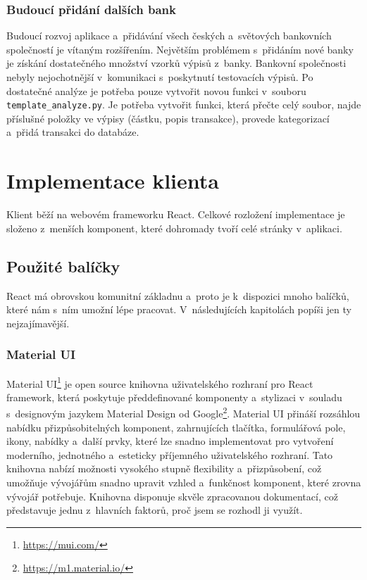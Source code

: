 \subsubsection{Budoucí přidání dalších bank}
\label{chap:addbank}
Budoucí rozvoj aplikace a~přidávání všech českých a~světových bankovních společností je vítaným rozšířením. Největším problémem s~přidáním nové banky je získání dostatečného množství vzorků výpisů z~banky. Bankovní společnosti nebyly nejochotnější v~komunikaci s~poskytnutí testovacích výpisů. Po dostatečné analýze je potřeba pouze vytvořit novou funkci v~souboru \texttt{template\_analyze.py}. Je potřeba vytvořit funkci, která přečte celý soubor, najde příslušné položky ve výpisy (částku, popis transakce), provede kategorizací a~přidá transakci do databáze.


\section{Implementace klienta} 

Klient běží na webovém frameworku React. Celkové rozložení implementace je složeno z~menších komponent, které dohromady tvoří celé stránky v~aplikaci.
\subsection{Použité balíčky}
React má obrovskou komunitní základnu a~proto je k~dispozici mnoho balíčků, které nám s~ním umožní lépe pracovat. V~následujících kapitolách popíši jen ty nejzajímavější.
\subsubsection{Material UI}
Material UI\footnote{\url{https://mui.com/}} je open source knihovna uživatelského rozhraní pro React framework, která poskytuje předdefinované komponenty a~stylizaci v~souladu s~designovým jazykem Material Design od Google\footnote{\url{https://m1.material.io/}}. Material UI přináší rozsáhlou nabídku přizpůsobitelných komponent, zahrnujících tlačítka, formulářová pole, ikony, nabídky a~další prvky, které lze snadno implementovat pro vytvoření moderního, jednotného a~esteticky příjemného uživatelského rozhraní. Tato knihovna nabízí možnosti vysokého stupně flexibility a~přizpůsobení, což umožňuje vývojářům snadno upravit vzhled a~funkčnost komponent, které zrovna vývojář potřebuje. Knihovna disponuje skvěle zpracovanou dokumentací, což představuje jednu z~hlavních faktorů, proč jsem se rozhodl ji využít.

